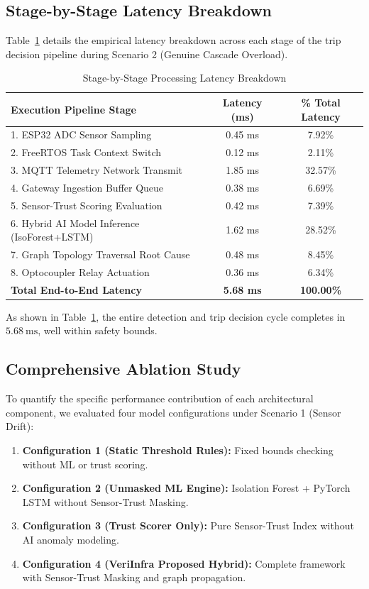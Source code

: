 \documentclass[conference]{IEEEtran}
\begin{document}
\subsection{Stage-by-Stage Latency Breakdown}
Table~\ref{tab:latency_breakdown} details the empirical latency breakdown across each stage of the trip decision pipeline during Scenario 2 (Genuine Cascade Overload).

\begin{table}[htbp]
\caption{Stage-by-Stage Processing Latency Breakdown}
\label{tab:latency_breakdown}
\begin{center}
\begin{tabular}{|l|c|c|}
\hline
\textbf{Execution Pipeline Stage} & \textbf{Latency (ms)} & \textbf{\% Total Latency} \\
\hline
1. ESP32 ADC Sensor Sampling & 0.45 ms & 7.92\% \\
2. FreeRTOS Task Context Switch & 0.12 ms & 2.11\% \\
3. MQTT Telemetry Network Transmit & 1.85 ms & 32.57\% \\
4. Gateway Ingestion Buffer Queue & 0.38 ms & 6.69\% \\
5. Sensor-Trust Scoring Evaluation & 0.42 ms & 7.39\% \\
6. Hybrid AI Model Inference (IsoForest+LSTM) & 1.62 ms & 28.52\% \\
7. Graph Topology Traversal Root Cause & 0.48 ms & 8.45\% \\
8. Optocoupler Relay Actuation & 0.36 ms & 6.34\% \\
\hline
\textbf{Total End-to-End Latency} & \textbf{5.68 ms} & \textbf{100.00\%} \\
\hline
\end{tabular}
\end{center}
\end{table}

As shown in Table~\ref{tab:latency_breakdown}, the entire detection and trip decision cycle completes in $5.68~\text{ms}$, well within safety bounds.

\subsection{Comprehensive Ablation Study}
To quantify the specific performance contribution of each architectural component, we evaluated four model configurations under Scenario 1 (Sensor Drift):

\begin{enumerate}
    \item \textbf{Configuration 1 (Static Threshold Rules):} Fixed bounds checking without ML or trust scoring.
    \item \textbf{Configuration 2 (Unmasked ML Engine):} Isolation Forest + PyTorch LSTM without Sensor-Trust Masking.
    \item \textbf{Configuration 3 (Trust Scorer Only):} Pure Sensor-Trust Index without AI anomaly modeling.
    \item \textbf{Configuration 4 (VeriInfra Proposed Hybrid):} Complete framework with Sensor-Trust Masking and graph propagation.
\end{enumerate}
\end{document}
